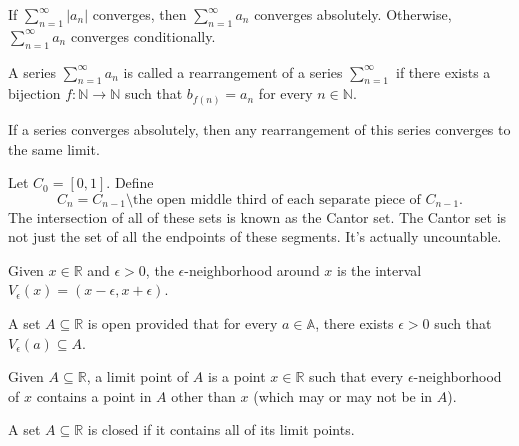 \documentclass{article}
\begin{document}
    If $\sum\limits_{n=1}^\infty|a_n|$ converges, then $\sum\limits_{n=1}^\infty a_n$ converges absolutely. Otherwise, $\sum\limits_{n=1}^\infty a_n$ converges conditionally.
    
\medskip
{}

    A series $\sum\limits_{n=1}^\infty a_n$ is called a rearrangement of a series $\sum\limits_{n=1}^\infty$ if there exists a bijection $f:\mathbb N \to \mathbb N$ such that $b_{f(n)} = a_n$ for every $n \in \mathbb N$.
    
\medskip
{}

    If a series converges absolutely, then any rearrangement of this series converges to the same limit.

\medskip
{}

    Let $C_0 = [0,1]$. Define $$C_n = C_{n-1} \setminus \text{the open middle third of each separate piece of } C_{n-1}.$$ The intersection of all of these sets is known as the Cantor set. The Cantor set is not just the set of all the endpoints of these segments. It's actually uncountable.

\medskip
{}

    Given $x \in \mathbb R$ and $\epsilon > 0$, the $\epsilon$-neighborhood around $x$ is the interval $V_\epsilon(x) = (x-\epsilon, x + \epsilon)$.

\medskip
{}

    A set $A \subseteq \mathbb R$ is open provided that for every $a \in \mathbb A$, there exists $\epsilon > 0$ such that $V_\epsilon(a) \subseteq A$.

\medskip
{}

    Given $A \subseteq \mathbb R$, a limit point of $A$ is a point $x \in \mathbb R$ such that every $\epsilon$-neighborhood of $x$ contains a point in $A$ other than $x$ (which may or may not be in $A$).

\medskip
{}

    A set $A \subseteq \mathbb R$ is closed if it contains all of its limit points.
\end{document}
